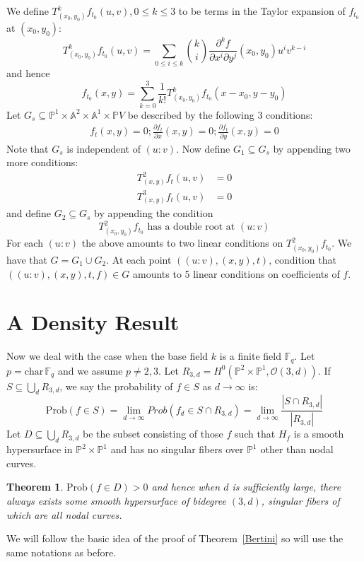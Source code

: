 \documentclass[12pt]{article}
\theoremstyle{plain}
\newtheorem{theorem}[equation]{Theorem}
\theoremstyle{definition}
\newcommand{\IA}{\mathbb{A}}
\newcommand{\IF}{\mathbb{F}}
\newcommand{\IP}{\mathbb{P}}
\newcommand{\sO}{\mathcal{O}}
\newcommand\union{\bigcup}
\newcommand{\<}{\langle}
\renewcommand{\>}{\rangle}
\newcommand{\p}{\partial}
\newcommand{\Prob}{\mathrm{Prob}}
\begin{document}
We define $T^k_{(x_0, y_0)}f_{t_0} (u, v), 0 \le k \le 3$ to be terms in the Taylor expansion of $f_{t_0}$ at $(x_0, y_0)$:
$$ T^k_{(x_0, y_0)}f_{t_0} (u, v) = \sum_{0 \le i \le k} {k \choose i} \frac{\p^k f}{\p x^i \p y^j}(x_0, y_0) u^i v^{k - i} $$
and hence
$$ f_{t_0}(x, y) = \sum_{k = 0}^3 \frac{1}{k!} T^k_{(x_0, y_0)}f_{t_0}(x - x_0, y - y_0) $$
Let $G_s \subseteq \IP^1 \times \IA^2 \times \IA^1 \times \IP V$ be described by the following $3$ conditions:
\begin{align*}
f_t(x , y) = 0 ; 
\frac{\p f_t}{\p x} (x, y) = 0 ; 
\frac{\p f_t}{\p y} (x, y) = 0 
\end{align*}
Note that $G_s$ is independent of $(u : v)$. Now define $G_1 \subseteq G_s$ by appending two more conditions:
\begin{align*}
T^2_{(x, y)}f_{t} (u, v) &= 0 \\
T^3_{(x, y)}f_{t} (u, v) &= 0 
\end{align*}
and define $G_2 \subseteq G_s$ by appending the condition 
$$ T^2_{(x_0, y_0)}f_{t_0} \text{ has a double root at } (u : v) $$
For each $(u : v)$ the above amounts to two linear conditions on $T^2_{(x_0, y_0)}f_{t_0}$. 
We have that $G = G_1 \cup G_2$. 
At each point $((u : v), (x, y), t)$, condition that $((u : v), (x, y), t, f) \in G$ amounts to 5 linear conditions on coefficients of $f$.

\section{A Density Result}
Now we deal with the case when the base field $k$ is a finite field $\IF_q$. Let $p = \mathrm{char}\, \IF_q$ and we assume $p \neq 2, 3$. 
Let $R_{3, d} = H^0(\IP^2 \times \IP^1, \sO(3, d))$. If $S \subseteq \union_d R_{3, d}$, we say the probability of $f \in S$ as $d \to \infty$ is:
$$ \Prob(f \in S) = \lim_{d \to \infty} Prob(f_d \in S \cap R_{3, d}) = \lim_{d \to \infty} \frac{|S \cap R_{3, d}|}{|R_{3, d}|} $$
Let $D \subseteq \union_d R_{3, d}$ be the subset consisting of those $f$ such that $H_f$ is a smooth hypersurface in $\IP^2 \times \IP^1$ and has no singular fibers over $\IP^1$ other than nodal curves. 
\begin{theorem}
$ \Prob(f \in D) > 0 $ and hence when $d$ is sufficiently large, there always exists some smooth hypersurface of bidegree $(3, d)$, singular fibers of which are all nodal curves. 
\end{theorem}


We will follow the basic idea of the proof of Theorem~\ref{Bertini} so will use the same notations as before. 
\end{document}
